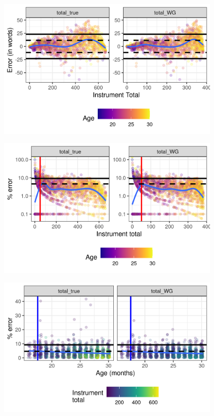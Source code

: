 \documentclass[letterpaper]{article}
\begin{document}
    \begin{figure}

        \centering

    		{\includegraphics[height=0.3\textheight]{../WG2WS_plots/error_in_words}}

    		{\includegraphics[height=0.3\textheight]{../WG2WS_plots/error_in_pct}}

    		{\includegraphics[height=0.3\textheight]{../WG2WS_plots/error_in_pct_by_age}}

    \end{figure}
\end{document}
